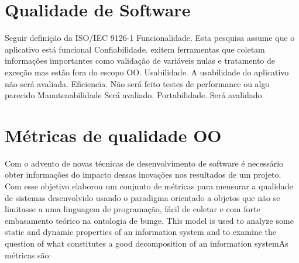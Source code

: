 

\section{Qualidade de Software}

Seguir definição da ISO/IEC 9126-1
Funcionalidade. Esta pesquisa assume que o aplicativo está funcional
Confiabilidade. exitem ferramentas que coletam informações importantes como
validação de variáveis nulas e tratamento de exceção mas estão fora do escopo
OO.
Usabilidade. A usabilidade do aplicativo não será
avaliada.
Eficiencia. Não será feito testes de performance ou algo parecido
Manutenabilidade Será avaliado.
Portabilidade. Será avalidado
\section{Métricas de qualidade OO}
\label{sec:metrics}

Com o advento de novas técnicas de desenvolvimento de software é necessário
obter informações do impacto dessas inovações nos resultados de um projeto. Com
esse objetivo  elaborou um conjunto de métricas para mensurar a
qualidade de sistemas desenvolvido usando o paradigma orientado a objetos que
não se limitasse a uma linguagem de programação, fácil de coletar e com forte
embasamento teórico na ontologia de bunge. This model is used to analyze
some static and dynamic properties of an information system and to examine the
question of what constitutes a good decomposition of an information
system\cite{WandWeber}As métricas são:




